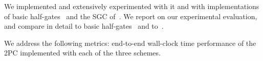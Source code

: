 We implemented \ourschemelong and extensively experimented with it and with implementations of basic half-gates~\cite{EC:ZahRosEva15} and the \stack SGC of~\HK.
We report on our experimental evaluation, and compare in detail to  basic half-gates~\cite{EC:ZahRosEva15} and to~\HK.

We address the following metrics: end-to-end wall-clock time performance of the 2PC implemented with each of the three schemes.